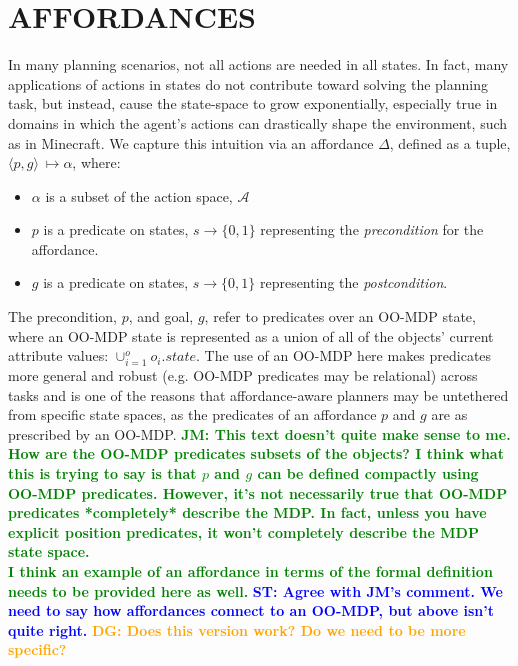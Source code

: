 \documentclass[]{article}
\newcommand{\stnote}[1]{\textcolor{Blue}{\textbf{ST: #1}}}
\newcommand{\jmnote}[1]{\textcolor{Green}{\textbf{JM: #1}}}
\newcommand{\dgnote}[1]{\textcolor{Orange}{\textbf{DG: #1}}}
\begin{document}



\section{AFFORDANCES}
\label{sec:affordances}


In many planning scenarios, not all actions are needed in all
states. In fact, many applications of actions in states do not
contribute toward solving the planning task, but instead, cause the
state-space to grow exponentially, especially true in domains in which
the agent's actions can drastically shape the environment, such as in
Minecraft. We capture this intuition via an affordance $\Delta$, defined 
as a tuple, $\langle p,g\rangle\ \longmapsto \alpha$,
where:
\begin{itemize}
\item[] $\alpha$ is a subset of the action space, $\mathcal{A}$
\item[] $p$ is a predicate on states, $s \longrightarrow \{$0$, 1\}$
  representing the {\em precondition} for the affordance.
\item[] $g$ is a predicate on states, $s \longrightarrow \{$0$,1\}$
  representing the {\em postcondition}.
\end{itemize}

The precondition, $p$, and goal, $g$, refer to predicates over an OO-MDP state, where an OO-MDP state is represented
as a union of all of the objects' current attribute values:
$\cup_{i = 1}^o o_i.state$.  The use of an OO-MDP here makes
predicates more general and robust (e.g. OO-MDP predicates may be relational) 
across tasks and is one of the reasons that affordance-aware 
planners may be untethered from specific state spaces, as the predicates of
an affordance $p$ and $g$ are as prescribed by an OO-MDP.
\jmnote{This text doesn't quite make sense to me. How are the OO-MDP
  predicates subsets of the objects? I think what this is trying to
  say is that $p$ and $g$ can be defined compactly using OO-MDP
  predicates. However, it's not necessarily true that OO-MDP
  predicates *completely* describe the MDP. In fact, unless you have
  explicit position predicates, it won't completely describe the MDP
  state space.  \\ I think an example of an affordance in terms of the
  formal definition needs to be provided here as well.}  \stnote{Agree
  with JM's comment.  We need to say how affordances connect to an
  OO-MDP, but above isn't quite right. } \dgnote{Does this version work? Do we need to be more specific?}
\end{document}
